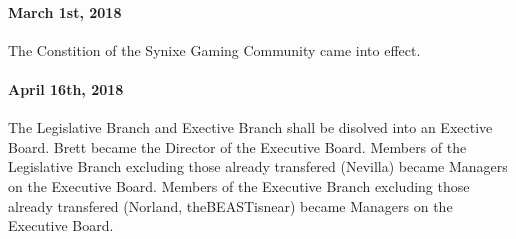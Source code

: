 \documentclass[10pt,a4paper]{article}
\begin{document}
\paragraph{March 1st, 2018}
The Constition of the Synixe Gaming Community came into effect.
\paragraph{April 16th, 2018}
The Legislative Branch and Exective Branch shall be disolved into an Exective Board. Brett became the Director of the Executive Board. Members of the Legislative Branch excluding those already transfered (Nevilla) became Managers on the Executive Board. Members of the Executive Branch excluding those already transfered (Norland, theBEASTisnear) became Managers on the Executive Board.
\end{document}
